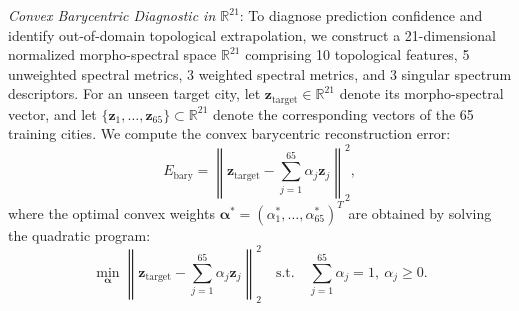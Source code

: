 \documentclass[journal]{IEEEtran}
\begin{document}
\textit{Convex Barycentric Diagnostic in $\mathbb{R}^{21}$}: To diagnose prediction confidence and identify out-of-domain topological extrapolation, we construct a 21-dimensional normalized morpho-spectral space $\mathbb{R}^{21}$ comprising 10 topological features, 5 unweighted spectral metrics, 3 weighted spectral metrics, and 3 singular spectrum descriptors. For an unseen target city, let $\mathbf{z}_{\text{target}} \in \mathbb{R}^{21}$ denote its morpho-spectral vector, and let $\{\mathbf{z}_1, \dots, \mathbf{z}_{65}\} \subset \mathbb{R}^{21}$ denote the corresponding vectors of the 65 training cities. We compute the convex barycentric reconstruction error:
\begin{equation}
E_{\text{bary}} = \left\| \mathbf{z}_{\text{target}} - \sum_{j=1}^{65} \alpha_j \mathbf{z}_j \right\|_2^2,
\label{eq:barycentric_error}
\end{equation}
where the optimal convex weights $\boldsymbol{\alpha}^* = (\alpha_1^*, \dots, \alpha_{65}^*)^T$ are obtained by solving the quadratic program:
\begin{equation}
\min_{\boldsymbol{\alpha}} \left\| \mathbf{z}_{\text{target}} - \sum_{j=1}^{65} \alpha_j \mathbf{z}_j \right\|_2^2 \quad \text{s.t.} \quad \sum_{j=1}^{65} \alpha_j = 1, \ \alpha_j \ge 0.
\label{eq:barycentric_qp}
\end{equation}

\begin{table}[htbp]
\caption{Barycentric Reconstruction Error vs. Max Relative Error}
\label{tab:barycentric}
\centering
{}
\end{table}
\end{document}
